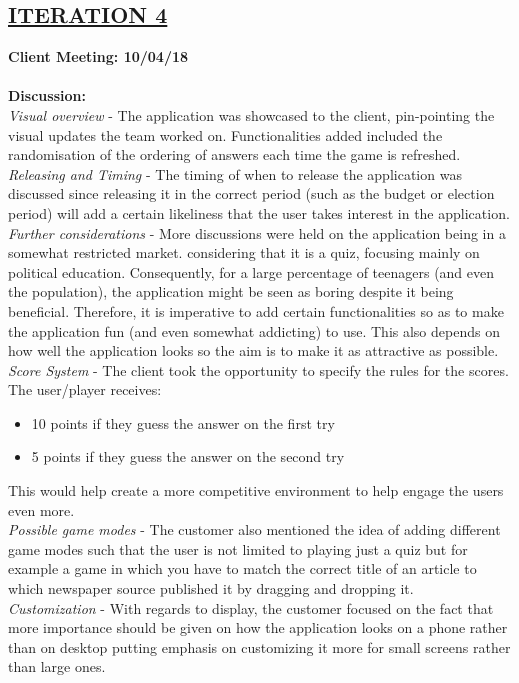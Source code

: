 \documentclass[paper=a4,fontsize=11pt]{article}
\newcommand{\SectionPart}[1]{\subsection*{\uppercase{#1}}}
\begin{document}
\SectionPart{\ul{Iteration 4}}
\hfill \textbf{Client Meeting: 10/04/18} \\
\\
\textbf{Discussion:}\\
\noindent
\textit{Visual overview} -
The application was showcased to the client, pin-pointing the visual updates the team worked on.
Functionalities added included the randomisation of the ordering of answers each time the game is refreshed.\\

\noindent
\textit{Releasing and Timing} -
The timing of when to release the application was discussed since releasing it in the correct
period (such as the budget or election period) will add a certain likeliness that the
user takes interest in the application.\\

\noindent
\textit{Further considerations} -
More discussions were held on the application being in a somewhat restricted market.
considering that it is a quiz, focusing mainly on political education. Consequently, for a
large percentage of teenagers (and even the population), the application might be seen as
boring despite it being beneficial. Therefore, it is
imperative to add certain functionalities so as to make the application fun (and even
somewhat addicting) to use. This also depends on how well the application looks so the aim
is to make it as attractive as possible.\\

\noindent
\textit{Score System} -
The client took the opportunity to specify the rules for the scores.
The user/player receives:
\begin{itemize}
	\item 10 points if they guess the answer on the first try
	\item 5 points if they guess the answer on the second try
\end{itemize}
This would help create a more competitive environment to help engage the users
even more.\\

\noindent
\textit{Possible game modes} -
The customer also mentioned the idea of adding different game modes
such that the user is not limited to playing just a quiz but for example a game in which you
have to match the correct title of an article to which newspaper source published it by dragging
and dropping it.\\

\noindent
\textit{Customization} -
With regards to display, the customer focused on the fact that more importance should be
given on how the application looks on a phone rather than on desktop putting emphasis on customizing it more
for small screens rather than large ones.\\
\end{document}
